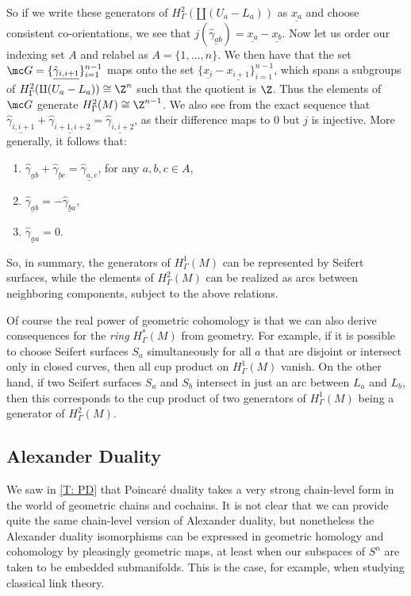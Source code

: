 \begin{example}
So if we write these generators of $H^2_\Gamma(\amalg(U_a-L_a))$ as $\underline{x_a}$ and choose consistent co-orientations, we see that $j(\underline{\hat \gamma_{ab}}) = \underline{x_a} - \underline{x_b}$.
Now let us order our indexing set $A$ and relabel as $A = \{1, \ldots , n\}$.
We then have that the set $\mc G = \{\underline{\hat \gamma_{i,i+1}}\}_{i=1}^{n-1}$ maps onto the set $\{\underline{x_i}-\underline{x_{i+1}}\}_{i=1}^{n-1}$, which spans a subgroups of $H^2_\Gamma(\amalg(U_a-L_a)) \cong \Z^n$ such that the quotient is $\Z$.
Thus the elements of $\mc G$ generate $H^2_\Gamma(M) \cong \Z^{n-1}$.
We also see from the exact sequence that $\underline{\hat \gamma_{i,i+1}}+\underline{\hat \gamma_{i+1,i+2}} = \underline{\hat \gamma_{i, i+2}}$, as their difference maps to $0$ but $j$ is injective.
More generally, it follows that:
\begin{enumerate}
\item $\underline{\hat \gamma_{ab}} + \underline{\hat \gamma_{bc}} =\underline{\hat \gamma_{a,c}}$, for any $a,b,c \in A$,
\item $\underline{\hat \gamma_{ab}} = -\underline{\hat \gamma_{ba}}$,
\item $\underline{\hat \gamma_{aa}}=0$.
\end{enumerate}


So, in summary, the generators of $H^1_\Gamma(M)$ can be represented by Seifert surfaces, while the elements of $H^2_\Gamma(M)$ can be realized as arcs between neighboring components, subject to the above relations.

Of course the real power of geometric cohomology is that we can also derive consequences for the \emph{ring} $H^*_\Gamma(M)$ from geometry.
For example, if it is possible to choose Seifert surfaces $S_a$ simultaneously for all $a$ that are disjoint or intersect only in closed curves, then all cup product on $H^1_\Gamma(M)$ vanish.
On the other hand, if two Seifert surfaces $S_a$ and $S_b$ intersect in just an arc between $L_a$ and $L_b$, then this corresponds to the cup product of two generators of $H^1_\Gamma(M)$ being a generator of $H^2_\Gamma(M)$.


\subsection{Alexander Duality}


We saw in \cref{T: PD} that Poincar\'e duality takes a very strong chain-level form in the world of geometric chains and cochains.
It is not clear that we can provide quite the same chain-level version of Alexander duality, but nonetheless the Alexander duality isomorphisms can be expressed in geometric homology and cohomology by pleasingly geometric maps, at least when our subspaces of $S^n$ are taken to be embedded submanifolds.
This is the case, for example, when studying classical link theory.


\end{example}
